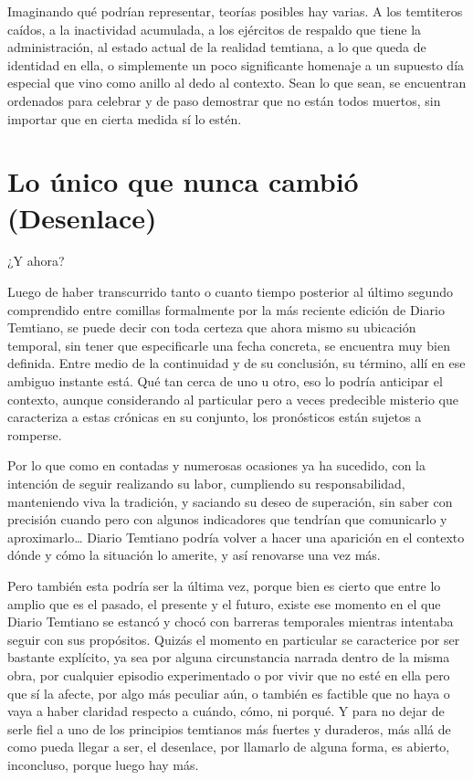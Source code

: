 \documentclass[
  spanish,
]{book}
\begin{document}
Imaginando qué podrían representar, teorías posibles hay varias. A los temtiteros caídos, a la inactividad acumulada, a los ejércitos de respaldo que tiene la administración, al estado actual de la realidad temtiana, a lo que queda de identidad en ella, o simplemente un poco significante homenaje a un supuesto día especial que vino como anillo al dedo al contexto. Sean lo que sean, se encuentran ordenados para celebrar y de paso demostrar que no están todos muertos, sin importar que en cierta medida sí lo estén.

\hypertarget{lo-uxfanico-que-nunca-cambiuxf3-desenlace}{%
\chapter{Lo único que nunca cambió (Desenlace)}\label{lo-uxfanico-que-nunca-cambiuxf3-desenlace}}

¿Y ahora?

Luego de haber transcurrido tanto o cuanto tiempo posterior al último segundo comprendido entre comillas formalmente por la más reciente edición de Diario Temtiano, se puede decir con toda certeza que ahora mismo su ubicación temporal, sin tener que especificarle una fecha concreta, se encuentra muy bien definida. Entre medio de la continuidad y de su conclusión, su término, allí en ese ambiguo instante está. Qué tan cerca de uno u otro, eso lo podría anticipar el contexto, aunque considerando al particular pero a veces predecible misterio que caracteriza a estas crónicas en su conjunto, los pronósticos están sujetos a romperse.

Por lo que como en contadas y numerosas ocasiones ya ha sucedido, con la intención de seguir realizando su labor, cumpliendo su responsabilidad, manteniendo viva la tradición, y saciando su deseo de superación, sin saber con precisión cuando pero con algunos indicadores que tendrían que comunicarlo y aproximarlo\ldots{} Diario Temtiano podría volver a hacer una aparición en el contexto dónde y cómo la situación lo amerite, y así renovarse una vez más.

Pero también esta podría ser la última vez, porque bien es cierto que entre lo amplio que es el pasado, el presente y el futuro, existe ese momento en el que Diario Temtiano se estancó y chocó con barreras temporales mientras intentaba seguir con sus propósitos. Quizás el momento en particular se caracterice por ser bastante explícito, ya sea por alguna circunstancia narrada dentro de la misma obra, por cualquier episodio experimentado o por vivir que no esté en ella pero que sí la afecte, por algo más peculiar aún, o también es factible que no haya o vaya a haber claridad respecto a cuándo, cómo, ni porqué. Y para no dejar de serle fiel a uno de los principios temtianos más fuertes y duraderos, más allá de como pueda llegar a ser, el desenlace, por llamarlo de alguna forma, es abierto, inconcluso, porque luego hay más.
\end{document}
